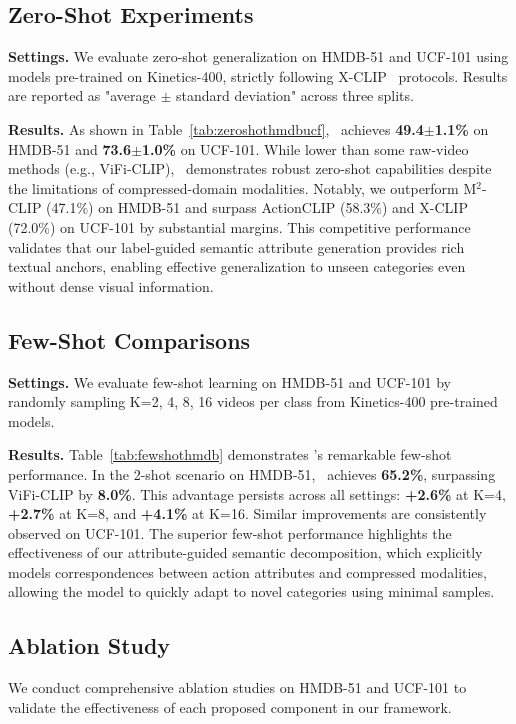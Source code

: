 \documentclass[runningheads]{llncs}
\begin{document}
\subsection{Zero-Shot Experiments}
\noindent\textbf{Settings.} We evaluate zero-shot generalization on HMDB-51 and UCF-101 using models pre-trained on Kinetics-400, strictly following X-CLIP~\cite{ni2022expanding} protocols. Results are reported as "average \ensuremath{\pm} standard deviation" across three splits.

\noindent\textbf{Results.} As shown in Table~\ref{tab:zeroshothmdbucf}, \methodname~achieves \textbf{49.4\ensuremath{\pm}1.1\%} on HMDB-51 and \textbf{73.6\ensuremath{\pm}1.0\%} on UCF-101. While lower than some raw-video methods (e.g., ViFi-CLIP), \methodname~demonstrates robust zero-shot capabilities despite the limitations of compressed-domain modalities. Notably, we outperform M\ensuremath{^2}-CLIP (47.1\%) on HMDB-51 and surpass ActionCLIP (58.3\%) and X-CLIP (72.0\%) on UCF-101 by substantial margins. This competitive performance validates that our label-guided semantic attribute generation provides rich textual anchors, enabling effective generalization to unseen categories even without dense visual information.

\subsection{Few-Shot Comparisons}
\noindent\textbf{Settings.} We evaluate few-shot learning on HMDB-51 and UCF-101 by randomly sampling K={2, 4, 8, 16} videos per class from Kinetics-400 pre-trained models.

\noindent\textbf{Results.} Table~\ref{tab:fewshothmdb} demonstrates \methodname's remarkable few-shot performance. In the 2-shot scenario on HMDB-51, \methodname~achieves \textbf{65.2\%}, surpassing ViFi-CLIP by \textbf{8.0\%}. This advantage persists across all settings: \textbf{+2.6\%} at K=4, \textbf{+2.7\%} at K=8, and \textbf{+4.1\%} at K=16. Similar improvements are consistently observed on UCF-101. The superior few-shot performance highlights the effectiveness of our attribute-guided semantic decomposition, which explicitly models correspondences between action attributes and compressed modalities, allowing the model to quickly adapt to novel categories using minimal samples.

\subsection{Ablation Study}
We conduct comprehensive ablation studies on HMDB-51 and UCF-101 to validate the effectiveness of each proposed component in our framework.
\end{document}

